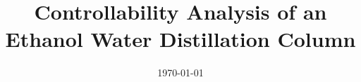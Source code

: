 \documentclass[a4paper,12pt]{article}
\title{Controllability Analysis of an Ethanol Water Distillation Column}
\date{\today}
\begin{document}

\newpage


\newpage


\newpage


\newpage


\newpage


\newpage


\newpage



\newpage
\printbibliography
\appendix
\newpage


\renewcommand{\thefigure}{\thesection.\arabic{figure}}
\renewcommand{\thetable}{\thesection.\arabic{table}}
\renewcommand{\thepage}{\thesection.\arabic{page}}
\end{document}
